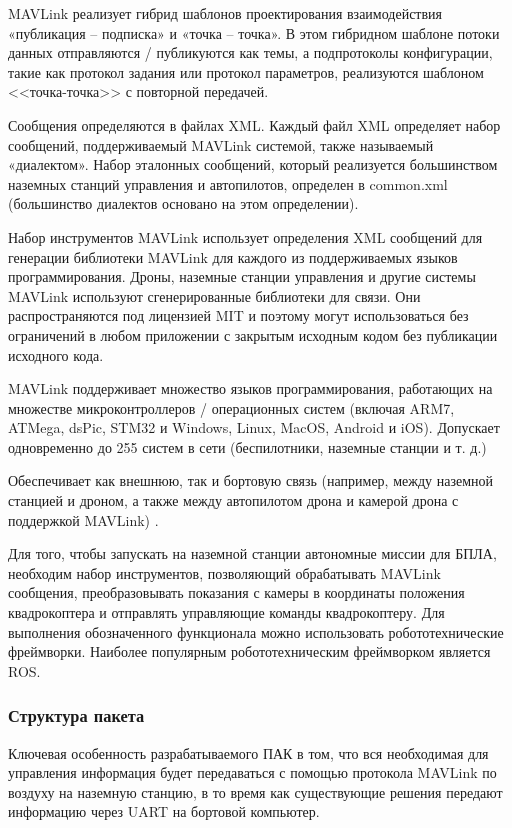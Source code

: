 MAVLink реализует гибрид шаблонов проектирования взаимодействия «публикация -- подписка» и «точка -- точка». В этом гибридном шаблоне потоки данных отправляются / публикуются как темы, а подпротоколы конфигурации, такие как протокол задания или протокол параметров, реализуются шаблоном <<точка-точка>> с повторной передачей.

Сообщения определяются в файлах XML. Каждый файл XML определяет набор сообщений, поддерживаемый MAVLink системой, также называемый «диалектом». Набор эталонных сообщений, который реализуется большинством наземных станций управления и автопилотов, определен в common.xml (большинство диалектов основано на этом определении).

Набор инструментов MAVLink использует определения XML сообщений для генерации библиотеки MAVLink для каждого из поддерживаемых языков программирования. Дроны, наземные станции управления и другие системы MAVLink используют сгенерированные библиотеки для связи. Они распространяются под лицензией MIT и поэтому могут использоваться без ограничений в любом приложении с закрытым исходным кодом без публикации исходного кода.

MAVLink поддерживает множество языков программирования, работающих на множестве микроконтроллеров / операционных систем (включая ARM7, ATMega, dsPic, STM32 и Windows, Linux, MacOS, Android и iOS). Допускает одновременно до 255 систем в сети (беспилотники, наземные станции и т. д.)

Обеспечивает как внешнюю, так и бортовую связь (например, между наземной станцией и дроном, а также между автопилотом дрона и камерой дрона с поддержкой MAVLink) \cite{mavlink}.


Для того, чтобы запускать на наземной станции автономные миссии для БПЛА, необходим набор инструментов, позволяющий обрабатывать MAVLink сообщения, преобразовывать показания с камеры в координаты положения квадрокоптера и отправлять управляющие команды квадрокоптеру. Для выполнения обозначенного функционала можно использовать робототехнические фреймворки. Наиболее популярным робототехническим фреймворком является ROS.
\subsubsection{Структура пакета}
Ключевая особенность разрабатываемого ПАК в том, что вся необходимая для управления информация будет передаваться с помощью протокола MAVLink по воздуху на наземную станцию, в то время как существующие решения передают информацию через UART на бортовой компьютер.

